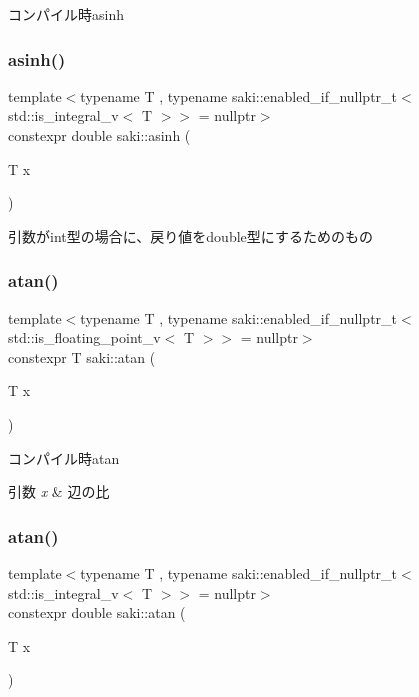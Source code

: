 コンパイル時asinh 

\mbox{\label{namespacesaki_aac840ca5d9b98ac0a8c5b15752f02072}} 
\subsubsection{\texorpdfstring{asinh()}{asinh()}\hspace{0.1cm}{\footnotesize\ttfamily [2/2]}}
{\footnotesize\ttfamily template$<$typename T , typename saki\+::enabled\+\_\+if\+\_\+nullptr\+\_\+t$<$ std\+::is\+\_\+integral\+\_\+v$<$ T $>$$>$  = nullptr$>$ \\
constexpr double saki\+::asinh (\begin{DoxyParamCaption}\item[{T}]{x }\end{DoxyParamCaption})}



引数がint型の場合に、戻り値をdouble型にするためのもの 

\mbox{\label{namespacesaki_a524b9439c745f69bd8a8b681b03b4b01}} 
\subsubsection{\texorpdfstring{atan()}{atan()}\hspace{0.1cm}{\footnotesize\ttfamily [1/2]}}
{\footnotesize\ttfamily template$<$typename T , typename saki\+::enabled\+\_\+if\+\_\+nullptr\+\_\+t$<$ std\+::is\+\_\+floating\+\_\+point\+\_\+v$<$ T $>$$>$  = nullptr$>$ \\
constexpr T saki\+::atan (\begin{DoxyParamCaption}\item[{T}]{x }\end{DoxyParamCaption})}



コンパイル時atan 


\begin{DoxyParams}{引数}
{\em x} & 辺の比 \\
\hline
\end{DoxyParams}
\mbox{\label{namespacesaki_acd8a08085fc9210a4e8d61f6c04febe2}} 
\subsubsection{\texorpdfstring{atan()}{atan()}\hspace{0.1cm}{\footnotesize\ttfamily [2/2]}}
{\footnotesize\ttfamily template$<$typename T , typename saki\+::enabled\+\_\+if\+\_\+nullptr\+\_\+t$<$ std\+::is\+\_\+integral\+\_\+v$<$ T $>$$>$  = nullptr$>$ \\
constexpr double saki\+::atan (\begin{DoxyParamCaption}\item[{T}]{x }\end{DoxyParamCaption})}



